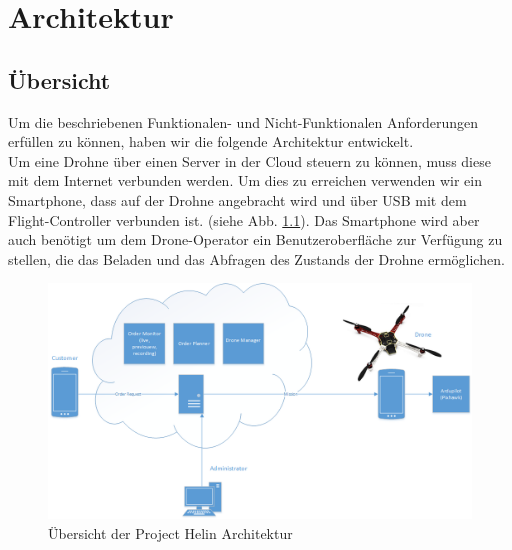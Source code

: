 \chapter{Architektur}

\section{Übersicht}

Um die beschriebenen Funktionalen- und Nicht-Funktionalen Anforderungen erfüllen zu können, haben wir die folgende Architektur entwickelt. \\
Um eine Drohne über einen Server in der Cloud steuern zu können, muss diese mit dem Internet verbunden werden. Um dies zu erreichen verwenden wir ein Smartphone, dass auf der Drohne angebracht wird und über USB mit dem Flight-Controller verbunden ist.  (siehe Abb. \ref{fig:architecture-overview}). Das Smartphone wird aber auch benötigt um dem Drone-Operator ein Benutzeroberfläche zur Verfügung zu stellen, die das Beladen und das Abfragen des Zustands der Drohne ermöglichen. \\
%
\begin{figure}[h]
	\includegraphics[width=1.0\textwidth]{images/Overview-Diagram.png}
	\caption{Übersicht der Project Helin Architektur }
	\label{fig:architecture-overview}
\end{figure}
%

